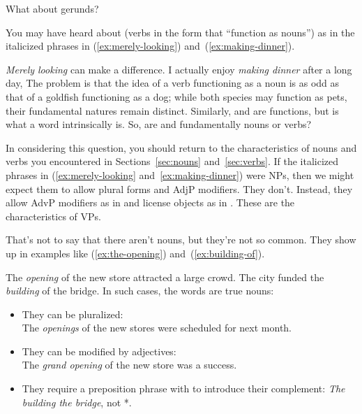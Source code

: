 \begin{tblsframed}{What about gerunds?}

You may have heard about  (verbs in the  form that \enquote{function as nouns}) as in the italicized phrases in (\ref{ex:merely-looking}) and~(\ref{ex:making-dinner}).

\ea\emph{Merely looking} can make a difference.\label{ex:merely-looking}
\ex I actually enjoy \emph{making dinner} after a long day, \label{ex:making-dinner}
\z
\indent The problem is that the idea of a verb functioning as a noun is as odd as that of a goldfish functioning as a dog; while both species may function as pets, their fundamental natures remain distinct. Similarly,  and  are functions, but  is what a word intrinsically is. So, are  and  fundamentally nouns or verbs?

\indent In considering this question, you should return to the characteristics of nouns and verbs you encountered in Sections~\ref{sec:nouns} and~\ref{sec:verbs}. If the italicized phrases in (\ref{ex:merely-looking} and~\ref{ex:making-dinner}) were NPs, then we might expect them to allow plural forms and AdjP modifiers. They don't. Instead, they allow AdvP modifiers as in  and license objects as in . These are the characteristics of VPs.

\indent That's not to say that there aren't  nouns, but they're not so common. They show up in examples like  (\ref{ex:the-opening}) and~(\ref{ex:building-of}).

\ea    The \emph{opening} of the new store attracted a large crowd. \label{ex:the-opening}
\ex   The city funded the \emph{building} of the bridge.\label{ex:building-of}
\z
\indent In such cases, the  words are true nouns:

\begin{itemize}[nosep, leftmargin=*]
    \item They can be pluralized: \\The \emph{openings} of the new stores were scheduled for next month.
    \item They can be modified by adjectives: \\The \emph{grand opening} of the new store was a success.
    \item They require a preposition phrase with  to introduce their complement: \textit{The building  the bridge}, not *.
\end{itemize}


\end{tblsframed}
